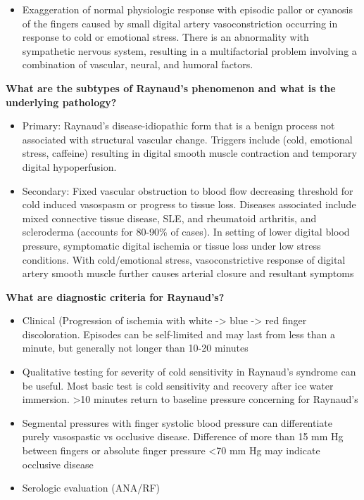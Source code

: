 \documentclass[
]{book}
\providecommand{\tightlist}{%
  \setlength{\itemsep}{0pt}\setlength{\parskip}{0pt}}
\begin{document}
\begin{itemize}
\tightlist
\item
  Exaggeration of normal physiologic response with episodic pallor or
  cyanosis of the fingers caused by small digital artery
  vasoconstriction occurring in response to cold or emotional stress.
  There is an abnormality with sympathetic nervous system, resulting
  in a multifactorial problem involving a combination of vascular,
  neural, and humoral factors.
\end{itemize}

\textbf{What are the subtypes of Raynaud's phenomenon and what is the
underlying pathology?}

\begin{itemize}
\item
  Primary: Raynaud's disease-idiopathic form that is a benign process
  not associated with structural vascular change. Triggers include
  (cold, emotional stress, caffeine) resulting in digital smooth
  muscle contraction and temporary digital hypoperfusion.
\item
  Secondary: Fixed vascular obstruction to blood flow decreasing
  threshold for cold induced vasospasm or progress to tissue loss.
  Diseases associated include mixed connective tissue disease, SLE,
  and rheumatoid arthritis, and scleroderma (accounts for 80-90\% of
  cases). In setting of lower digital blood pressure, symptomatic
  digital ischemia or tissue loss under low stress conditions. With
  cold/emotional stress, vasoconstrictive response of digital artery
  smooth muscle further causes arterial closure and resultant symptoms
\end{itemize}

\textbf{What are diagnostic criteria for Raynaud's?}

\begin{itemize}
\item
  Clinical (Progression of ischemia with white -\textgreater{} blue -\textgreater{} red finger
  discoloration. Episodes can be self-limited and may last from less
  than a minute, but generally not longer than 10-20 minutes~
\item
  Qualitative testing for severity of cold sensitivity in Raynaud's
  syndrome can be useful. Most basic test is cold sensitivity and
  recovery after ice water immersion. \textgreater10 minutes return to baseline
  pressure concerning for Raynaud's
\item
  Segmental pressures with finger systolic blood pressure can
  differentiate purely vasospastic vs occlusive disease. Difference of
  more than 15 mm Hg between fingers or absolute finger pressure \textless70
  mm Hg may indicate occlusive disease~
\item
  Serologic evaluation (ANA/RF)
\end{itemize}
\end{document}
